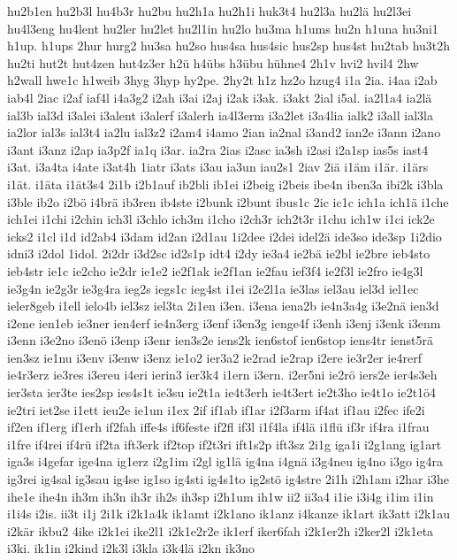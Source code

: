 {hu2b1en
hu2b3l
hu4b3r
hu2bu
hu2h1a
hu2h1i
huk3t4
hu2l3a
hu2lä
hu2l3ei
hu4l3eng
hu4lent
hu2ler
hu2let
hu2l1in
hu2lo
hu3ma
h1ums
hu2n
h1una
hu3ni1
h1up.
h1ups
2hur
hurg2
hu3sa
hu2so
hus4sa
hus4sic
hus2sp
hus4st
hu2tab
hu3t2h
hu2ti
hut2t
hut4zen
hut4z3er
h2ü
h4übs
h3übu
hühne4
2h1v
hvi2
hvil4
2hw
h2wall
hwe1c
h1weib
3hyg
3hyp
hy2pe.
2hy2t
h1z
hz2o
hzug4
i1a
2ia.
i4aa
i2ab
iab4l
2iac
i2af
iaf4l
i4a3g2
i2ah
i3ai
i2aj
i2ak
i3ak.
i3akt
2ial
i5al.
ia2l1a4
ia2lä
ial3b
ial3d
i3alei
i3alent
i3alerf
i3alerh
ia4l3erm
i3a2let
i3a4lia
ialk2
i3all
ial3la
ia2lor
ial3s
ial3t4
ia2lu
ial3z2
i2am4
i4amo
2ian
ia2nal
i3and2
ian2e
i3ann
i2ano
i3ant
i3anz
i2ap
ia3p2f
ia1q
i3ar.
ia2ra
2ias
i2asc
ia3sh
i2asi
i2a1sp
ias5s
iast4
i3at.
i3a4ta
i4ate
i3at4h
1iatr
i3ats
i3au
ia3un
iau2s1
2iav
2iä
i1äm
i1är.
i1ärs
i1ät.
i1äta
i1ät3s4
2i1b
i2b1auf
ib2bli
ib1ei
i2beig
i2beis
ibe4n
iben3a
ibi2k
i3bla
i3ble
ib2o
i2bö
i4brä
ib3ren
ib4ste
i2bunk
i2bunt
ibus1c
2ic
ic1c
ich1a
ich1ä
i1che
ich1ei
i1chi
i2chin
ich3l
i3chlo
ich3m
i1cho
i2ch3r
ich2t3r
i1chu
ich1w
i1ci
ick2e
icks2
i1cl
i1d
id2ab4
i3dam
id2an
i2d1au
1i2dee
i2dei
idel2ä
ide3so
ide3sp
1i2dio
idni3
i2dol
1idol.
2i2dr
i3d2sc
id2s1p
idt4
i2dy
ie3a4
ie2bä
ie2bl
ie2bre
ieb4sto
ieb4str
ie1c
ie2cho
ie2dr
ie1e2
ie2f1ak
ie2f1an
ie2fau
ief3f4
ie2f3l
ie2fro
ie4g3l
ie3g4n
ie2g3r
ie3g4ra
ieg2s
iegs1c
ieg4st
i1ei
i2e2l1a
ie3las
iel3au
iel3d
iel1ec
ieler8geb
i1ell
ielo4b
iel3sz
iel3ta
2i1en
i3en.
i3ena
iena2b
ie4n3a4g
i3e2nä
ien3d
i2ene
ien1eb
ie3ner
ien4erf
ie4n3erg
i3enf
i3en3g
ienge4f
i3enh
i3enj
i3enk
i3enm
i3enn
i3e2no
i3enö
i3enp
i3enr
ien3s2e
iens2k
ien6stof
ien6stop
iens4tr
ienst5rä
ien3sz
ie1nu
i3env
i3enw
i3enz
ie1o2
ier3a2
ie2rad
ie2rap
i2ere
ie3r2er
ie4rerf
ie4r3erz
ie3res
i3ereu
i4eri
ierin3
ier3k4
i1ern
i3ern.
i2er5ni
ie2rö
iers2e
ier4s3eh
ier3sta
ier3te
ies2sp
ies4s1t
ie3su
ie2t1a
ie4t3erh
ie4t3ert
ie2t3ho
ie4t1o
ie2t1ö4
ie2tri
iet2se
i1ett
ieu2e
ie1un
i1ex
2if
if1ab
if1ar
i2f3arm
if4at
if1au
i2fec
ife2i
if2en
if1erg
if1erh
if2fah
iffe4s
if6feste
if2fl
if3l
i1f4la
if4lä
i1flü
if3r
if4ra
i1frau
i1fre
if4rei
if4rü
if2ta
ift3erk
if2top
if2t3ri
ift1s2p
ift3sz
2i1g
iga1i
i2g1ang
ig1art
iga3s
i4gefar
ige4na
ig1erz
i2g1im
i2gl
ig1lä
ig4na
i4gnä
i3g4neu
ig4no
i3go
ig4ra
ig3rei
ig4sal
ig3sau
ig4se
ig1so
ig4sti
ig4s1to
ig2stö
ig4stre
2i1h
i2h1am
i2har
i3he
ihe1e
ihe4n
ih3m
ih3n
ih3r
ih2s
ih3sp
i2h1um
ih1w
ii2
ii3a4
i1ie
i3i4g
i1im
i1in
i1i4s
i2is.
ii3t
i1j
2i1k
i2k1a4k
ik1amt
i2k1ano
ik1anz
i4kanze
ik1art
ik3att
i2k1au
i2kär
ikbu2
4ike
i2k1ei
ike2l1
i2k1e2r2e
ik1erf
iker6fah
i2k1er2h
i2ker2l
i2k1eta
i3ki.
ik1in
i2kind
i2k3l
i3kla
i3k4lä
i2kn
ik3no
}
